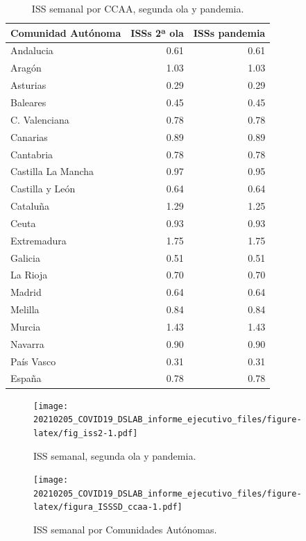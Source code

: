 \documentclass[
  11pt,
]{article}
\begin{document}
\begin{table}[!h]

\caption{\label{tab:tabla2}ISS semanal por CCAA, segunda ola y pandemia.}
\centering
\fontsize{9}{11}\selectfont
\begin{tabular}[t]{l|r|r}
\hline
Comunidad Autónoma & ISSs 2ª ola & ISSs pandemia\\
\hline
Andalucia & 0.61 & 0.61\\
\hline
Aragón & 1.03 & 1.03\\
\hline
Asturias & 0.29 & 0.29\\
\hline
Baleares & 0.45 & 0.45\\
\hline
C. Valenciana & 0.78 & 0.78\\
\hline
Canarias & 0.89 & 0.89\\
\hline
Cantabria & 0.78 & 0.78\\
\hline
Castilla La Mancha & 0.97 & 0.95\\
\hline
Castilla y León & 0.64 & 0.64\\
\hline
Cataluña & 1.29 & 1.25\\
\hline
Ceuta & 0.93 & 0.93\\
\hline
Extremadura & 1.75 & 1.75\\
\hline
Galicia & 0.51 & 0.51\\
\hline
La Rioja & 0.70 & 0.70\\
\hline
Madrid & 0.64 & 0.64\\
\hline
Melilla & 0.84 & 0.84\\
\hline
Murcia & 1.43 & 1.43\\
\hline
Navarra & 0.90 & 0.90\\
\hline
País Vasco & 0.31 & 0.31\\
\hline
España & 0.78 & 0.78\\
\hline
\end{tabular}
\end{table}

\begin{figure}
\centering
\texttt{[image: 20210205\_COVID19\_DSLAB\_informe\_ejecutivo\_files/figure-latex/fig\_iss2-1.pdf]}
\caption{\label{fig:fig_iss2} ISS semanal, segunda ola y pandemia.}
\end{figure}

\begin{figure}
\centering
\texttt{[image: 20210205\_COVID19\_DSLAB\_informe\_ejecutivo\_files/figure-latex/figura\_ISSSD\_ccaa-1.pdf]}
\caption{\label{fig:figura_ISSSD_ccaa} ISS semanal por Comunidades
Autónomas.}
\end{figure}
\end{document}
